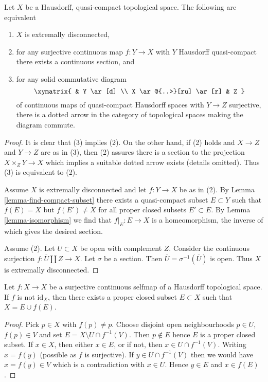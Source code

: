 \begin{proposition}
\label{proposition-projective-in-category-hausdorff-qc}
Let $X$ be a Hausdorff, quasi-compact topological space.
The following are equivalent
\begin{enumerate}
\item $X$ is extremally disconnected,
\item for any surjective continuous map $f : Y \to X$ with $Y$ Hausdorff
quasi-compact there exists a continuous section, and
\item for any solid commutative diagram
$$
\xymatrix{
& Y \ar[d] \\
X \ar@{..>}[ru] \ar[r] & Z
}
$$
of continuous maps of quasi-compact Hausdorff spaces with $Y \to Z$
surjective, there is a dotted arrow
in the category of topological spaces making the diagram commute.
\end{enumerate}
\end{proposition}

\begin{proof}
It is clear that (3) implies (2). On the other hand, if (2) holds
and $X \to Z$ and $Y \to Z$ are as in (3), then (2) assures there
is a section to the projection $X \times_Z Y \to X$ which implies
a suitable dotted arrow exists (details omitted). Thus (3)
is equivalent to (2).

\medskip\noindent
Assume $X$ is extremally disconnected and let $f : Y \to X$ be as in (2).
By Lemma \ref{lemma-find-compact-subset} there exists a quasi-compact subset
$E \subset Y$ such that $f(E) = X$ but $f(E') \not = X$ for all
proper closed subsets $E' \subset E$. By
Lemma \ref{lemma-isomorphism} we find that $f|_E : E \to X$
is a homeomorphism, the inverse of which gives the desired section.

\medskip\noindent
Assume (2). Let $U \subset X$ be open with complement $Z$.
Consider the continuous surjection $f : \overline{U} \amalg Z \to X$.
Let $\sigma$ be a section. Then $\overline{U} = \sigma^{-1}(\overline{U})$
is open. Thus $X$ is extremally disconnected.
\end{proof}

\begin{lemma}
\label{lemma-rainwater}
Let $f : X \to X$ be a surjective continuous selfmap of a Hausdorff
topological space. If $f$ is not $\text{id}_X$, then there exists a
proper closed subset $E \subset X$ such that $X = E \cup f(E)$.
\end{lemma}

\begin{proof}
Pick $p \in X$ with $f(p) \not = p$. Choose disjoint open neighbourhoods
$p \in U$, $f(p) \in V$ and set $E = X \setminus U \cap f^{-1}(V)$.
Then $p \not \in E$ hence $E$ is a proper closed subset.
If $x \in X$, then either $x \in E$, or if not, then $x \in U \cap f^{-1}(V)$.
Writing $x = f(y)$ (possible as $f$ is surjective). If $y \in U \cap f^{-1}(V)$
then we would have $x = f(y) \in V$ which is a contradiction with
$x \in U$. Hence $y \in E$ and $x \in f(E)$.
\end{proof}

